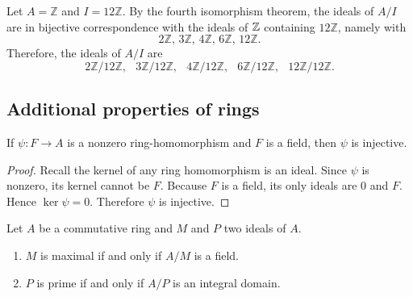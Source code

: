 \documentclass[11pt,a4paper]{article}
\begin{document}
\begin{exa}
    Let $A = \mathbb{Z}$ and $I = 12\mathbb{Z}$. By the fourth isomorphism theorem, the ideals of $A/I$ are in bijective correspondence with the ideals of \(\mathbb{Z}\) containing $12\mathbb{Z}$, namely with 
    \[
    2\mathbb{Z}, \, 3\mathbb{Z}, \, 4\mathbb{Z}, \, 6\mathbb{Z}, \, 12\mathbb{Z}.
    \]
    Therefore, the ideals of $A/I$ are
    \[
    2\mathbb{Z}/12\mathbb{Z}, \;\;\, 3\mathbb{Z}/12\mathbb{Z}, \;\;\, 4\mathbb{Z}/12\mathbb{Z}, \;\;\, 6\mathbb{Z}/12\mathbb{Z}, \;\;\, 12\mathbb{Z}/12\mathbb{Z}.
    \]
\end{exa}
    

\subsection{Additional properties of rings}

\begin{prop} 
If \(\psi\colon F\to A\) is a nonzero ring-homomorphism and \(F\) is a field, then \(\psi\) is injective.
\end{prop}

\begin{proof}
Recall the kernel of any ring homomorphism is an ideal. 
Since \(\psi\) is nonzero, its kernel cannot be \(F\).
Because \(F\) is a field, its only ideals are \(0\) and \(F\).
Hence \(\ker\psi = 0\).
Therefore \(\psi\) is injective.
\end{proof}


\begin{teo}%
Let $A$ be a commutative ring and \(M\) and \(P\) two ideals of \(A\).
\begin{enumerate}[label=(\roman*)]
    \item  $M$ is maximal if and only if $A/M$ is a field.
    \item  $P$ is prime if and only if $A/P$ is an integral domain.
\end{enumerate}
\end{teo}
\end{document}

